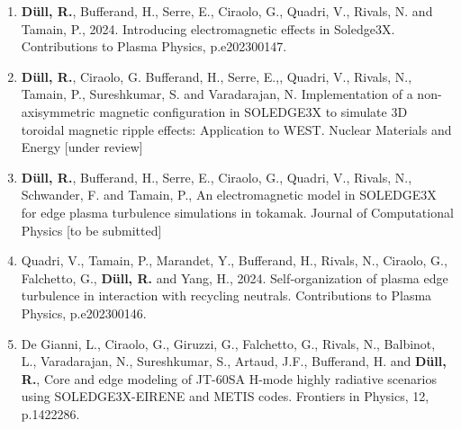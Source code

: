 \newpage
{}
\label{chap:publications}
\begin{enumerate}
\item \textbf{Düll, R.}, Bufferand, H., Serre, E., Ciraolo, G., Quadri, V., Rivals, N. and Tamain, P., 2024. Introducing electromagnetic effects in Soledge3X. Contributions to Plasma Physics, p.e202300147.
\item \textbf{Düll, R.}, Ciraolo, G. Bufferand, H., Serre, E.,, Quadri, V., Rivals, N., Tamain, P., Sureshkumar, S. and Varadarajan, N. Implementation of a non-axisymmetric magnetic configuration in SOLEDGE3X to simulate 3D toroidal magnetic ripple effects: Application to WEST. Nuclear Materials and Energy [under review]
\item \textbf{Düll, R.}, Bufferand, H., Serre, E., Ciraolo, G., Quadri, V., Rivals, N., Schwander, F. and Tamain, P., An electromagnetic model in SOLEDGE3X for edge plasma turbulence simulations in tokamak. Journal of Computational Physics [to be submitted]
\item Quadri, V., Tamain, P., Marandet, Y., Bufferand, H., Rivals, N., Ciraolo, G., Falchetto, G., \textbf{Düll, R.} and Yang, H., 2024. Self‐organization of plasma edge turbulence in interaction with recycling neutrals. Contributions to Plasma Physics, p.e202300146.
\item De Gianni, L., Ciraolo, G., Giruzzi, G., Falchetto, G., Rivals, N., Balbinot, L., Varadarajan, N., Sureshkumar, S., Artaud, J.F., Bufferand, H. and \textbf{Düll, R.}, Core and edge modeling of JT-60SA H-mode highly radiative scenarios using SOLEDGE3X-EIRENE and METIS codes. Frontiers in Physics, 12, p.1422286.
\end{enumerate}

\newpage

